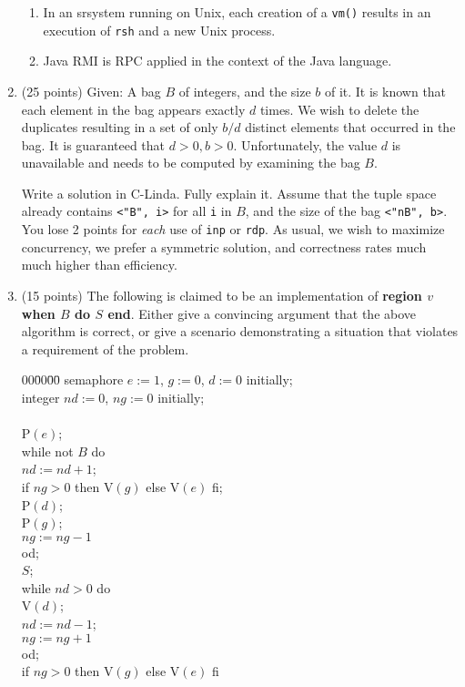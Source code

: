 \documentclass[12pt]{article}
\def\SR{{\sc sr}}
\begin{document}
\begin{enumerate}
\begin{enumerate}
\item
In an \SR system running on Unix, each creation of a {\tt vm()}
results in an execution of {\tt rsh} and a new Unix process.

\item
Java RMI is RPC applied in the context of the Java language.

\end{enumerate}

\item (25 points)
Given: A bag $B$ of integers, and the size $b$ of it.  It is known
that each element in the bag appears exactly $d$ times.  We wish to
delete the duplicates resulting in a set of only $b/d$ distinct
elements that occurred in the bag.  It is guaranteed that $d > 0, b >
0$.  Unfortunately, the value $d$ is unavailable and needs to be
computed by examining the bag $B$.

Write a solution in C-Linda.  Fully explain it.  Assume that the tuple
space already contains {\tt <"B", i>} for all {\tt i} in $B$, and the
size of the bag {\tt <"nB", b>}.  You lose 2 points for {\sl each} use
of {\tt inp} or {\tt rdp}.  As usual, we wish to maximize concurrency,
we prefer a symmetric solution, and correctness rates much much higher
than efficiency.

\item (15 points)
The following is claimed to be an implementation of {\bf region $v$
when $B$ do $S$ end}.  Either give a convincing argument that the
above algorithm is correct, or give a scenario demonstrating a
situation that violates a requirement of the problem.

{\bf
\begin{tabbing}
00\=00\=00\=\kill
semaphore $e := 1$, $g := 0$, $d := 0$ initially;\\
integer $nd := 0$, $ng := 0$ initially;\\
\\
P$(e)$;\\
while not $B$ do\+\\
  $nd := nd + 1$;\\
  if $ng > 0$ then V$(g)$ else V$(e)$ fi;\\
  P$(d)$;\\
  P$(g)$;\\
  $ng := ng - 1$\-\\
od;\\
$S$;\\
while $nd > 0$ do\+\\
  V$(d)$;\\
  $nd := nd - 1$;\\
  $ng := ng + 1$\-\\
od;\\
if $ng > 0$ then V$(g)$ else V$(e)$ fi
\end{tabbing}
}


\end{enumerate}
\end{document}
